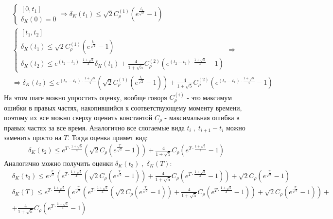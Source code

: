 \documentclass[a4paper,12pt]{article}
\begin{document}
\begin{align*}
    &\left\{
    \begin{array}{l}
        \left[0,t_1\right]\\
        \delta_K(0)=0
    \end{array}
    \right.\Rightarrow
    \delta_K(t_1) \leqslant \sqrt{2} C_{\rho}^{(1)} \left(e^{\frac{t_1}{\sqrt{2}}}-1\right)
    \\
    &\left\{
    \begin{array}{l}
        \left[t_1,t_2\right]\\
        \delta_K(t_1) \leqslant \sqrt{2} C_{\rho}^{(1)} \left(e^{\frac{t_1}{\sqrt{2}}}-1\right)\\
        \delta_K(t_2) \leqslant e^{(t_2-t_1)\cdot\frac{1+\sqrt{5}}{4}}\delta_K(t_1)+\frac{4}{1+\sqrt{5}} C_{\rho}^{(2)} \left(e^{(t_2-t_1)\cdot\frac{1+\sqrt{5}}{4}}-1\right)
    \end{array}
    \right.\Rightarrow
    \\
    &\Rightarrow
    \delta_K(t_2) \leqslant e^{(t_2-t_1)\cdot\frac{1+\sqrt{5}}{4}}\left(
        \sqrt{2} C_{\rho}^{(1)} \left(e^{\frac{t_1}{\sqrt{2}}}-1\right)
    \right)+\frac{4}{1+\sqrt{5}} C_{\rho}^{(2)} \left(e^{(t_2-t_1)\cdot\frac{1+\sqrt{5}}{4}}-1\right)
\end{align*}
На этом шаге можно упростить оценку, вообще говоря $C_{\rho}^{(i)}$ - это максимум ошибки в правых частях, накопившийся к соответствующему моменту времени, поэтому их все можно сверху оценить константой $C_{\rho}$ - максимальная ошибка в правых частях за все время.
Аналогично все слогаемые вида $t_i \;,\; t_{i+1}-t_i$ можно заменить просто на $T$. Тогда оценка примет вид:
\begin{align*}
    \delta_K(t_2) \leqslant e^{T\cdot\frac{1+\sqrt{5}}{4}}\left(
        \sqrt{2} C_{\rho} \left(e^{\frac{T}{\sqrt{2}}}-1\right)
    \right)+\frac{4}{1+\sqrt{5}} C_{\rho}\left(e^{T\cdot\frac{1+\sqrt{5}}{4}}-1\right)
\end{align*}
Аналогично можно получить оценки $\delta_K(t_3) \; ,\; \delta_K(T)$:
\begin{align*}
    &\delta_K(t_3) \leqslant e^{\frac{T}{\sqrt{2}}}\left(
        e^{T\cdot\frac{1+\sqrt{5}}{4}}\left(
            \sqrt{2} C_{\rho} \left(e^{\frac{T}{\sqrt{2}}}-1\right)
        \right)+\frac{4}{1+\sqrt{5}} C_{\rho}\left(e^{T\cdot\frac{1+\sqrt{5}}{4}}-1\right)
    \right)+\sqrt{2} C_{\rho} \left(e^{\frac{T}{\sqrt{2}}}-1\right)
    \\
    &\delta_K(T) \leqslant e^{T\cdot\frac{1+\sqrt{5}}{4}}\left(
        e^{\frac{T}{\sqrt{2}}}\left(
        e^{T\cdot\frac{1+\sqrt{5}}{4}}\left(
            \sqrt{2} C_{\rho} \left(e^{\frac{T}{\sqrt{2}}}-1\right)
        \right)+\frac{4}{1+\sqrt{5}} C_{\rho}\left(e^{T\cdot\frac{1+\sqrt{5}}{4}}-1\right)
    \right)+\sqrt{2} C_{\rho} \left(e^{\frac{T}{\sqrt{2}}}-1\right)
    \right)+
    \\
    &+\frac{4}{1+\sqrt{5}} C_{\rho} \left(e^{T\cdot\frac{1+\sqrt{5}}{4}}-1\right)
\end{align*}
\end{document}
